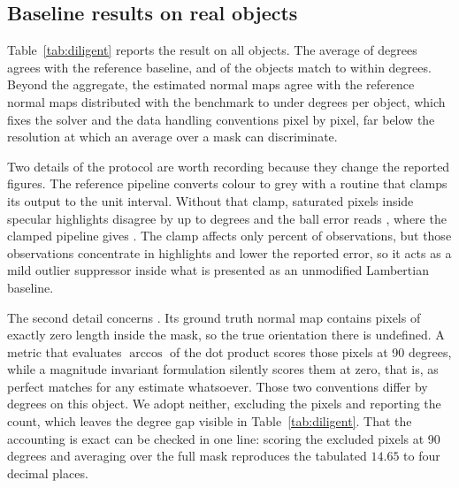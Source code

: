 \documentclass[10pt,twocolumn,letterpaper]{article}
\begin{document}
\begin{table}
  \centering
    {}{}
  \caption{Mean angular error in degrees on the benchmark, against the
  reference Lambertian baseline distributed with it. \diligentAgreeCount{} of
  \diligentObjects{} objects agree to within \diligentAgreeDelta{} degrees. The
  exception, \diligentWorstObject{}, is discussed in
  Section~\ref{sec:baseline}.}
  \label{tab:diligent}
\end{table}

\subsection{Baseline results on real objects}
\label{sec:baseline}

Table~\ref{tab:diligent} reports the result on all \diligentObjects{} objects.
The average of \diligentAvg{} degrees agrees with the reference baseline, and
\diligentAgreeCount{} of the \diligentObjects{} objects match to within
\diligentAgreeDelta{} degrees. Beyond the aggregate, the estimated normal maps
agree with the reference normal maps distributed with the benchmark to under
\officialAgree{} degrees per object, which fixes the solver and the data
handling conventions pixel by pixel, far below the resolution at which an
average over a mask can discriminate.

Two details of the protocol are worth recording because they change the
reported figures. The reference pipeline converts colour to grey with a routine
that clamps its output to the unit interval. Without that clamp, saturated
pixels inside specular highlights disagree by up to \clipMaxDisagree{} degrees
and the ball error reads \clipMaeWithout{}, where the clamped pipeline gives
\diligentBall{}. The clamp affects only \clipFraction{} percent of
observations, but those observations concentrate in highlights and lower the
reported error, so it acts as a mild outlier suppressor inside what is
presented as an unmodified Lambertian baseline.

The second detail concerns \diligentWorstObject{}. Its ground truth normal map
contains \degeneratePixels{} pixels of exactly zero length inside the mask, so
the true orientation there is undefined. A metric that evaluates $\arccos$ of
the dot product scores those pixels at 90 degrees, while a magnitude invariant
formulation silently scores them at zero, that is, as perfect matches for any
estimate whatsoever. Those two conventions differ by \degenerateSwing{}
degrees on this object. We adopt neither, excluding the pixels and reporting
the count, which leaves the \degenerateGap{} degree gap visible in
Table~\ref{tab:diligent}. That the accounting is exact can be checked in one
line: scoring the excluded pixels at 90 degrees and averaging over the full
mask reproduces the tabulated $14.65$ to four decimal places.
\end{document}
